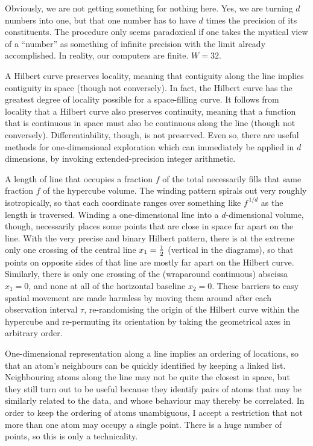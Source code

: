 Obviously, we are not getting something for nothing here.
Yes, we are turning $d$ numbers into one, but that one number has to have $d$ times the precision of its constituents.
The procedure only seems paradoxical if one takes the mystical view of a ``number'' as something of infinite precision with the limit already accomplished.
In reality, our computers are finite.  $W=32$.

A Hilbert curve preserves locality, meaning that contiguity along the line implies contiguity in space (though not conversely).  
In fact, the Hilbert curve has the greatest degree of locality possible for a space-filling curve.
It follows from locality that a Hilbert curve also preserves continuity, 
meaning that a function that is continuous in space must also be continuous along the line (though not conversely).
Differentiability, though, is not preserved.
Even so, there are useful methods for one-dimensional exploration which can immediately be applied in $d$ dimensions,
by invoking extended-precision integer arithmetic.

A length of line that occupies a fraction $f$ of the total necessarily fills that same fraction $f$ of the hypercube volume.
The winding pattern spirals out very roughly isotropically, so that each coordinate ranges over something like $f^{\,1/d}$ as the length is traversed.
Winding a one-dimensional line into a $d$-dimensional volume, though, necessarily places some points that are close in space far apart on the line.
With the very precise and binary Hilbert pattern, there is at the extreme only one crossing of the central line $x_1 = {1\over2}$ (vertical in the diagrams), 
so that points on opposite sides of that line are mostly far apart on the Hilbert curve.
Similarly, there is only one crossing of the (wraparound continuous) abscissa $x_1 = 0$, and none at all of the horizontal baseline $x_2 = 0$.
These barriers to easy spatial movement are made harmless by moving them around after each observation interval $\tau$, 
re-randomising the origin of the Hilbert curve within the hypercube and re-permuting its orientation by taking the geometrical axes in arbitrary order.

One-dimensional representation along a line implies an ordering of locations, so that an atom's neighbours can be quickly identified by keeping a linked list.
Neighbouring atoms along the line may not be quite the closest in space, 
but they still turn out to be useful because they identify pairs of atoms that may be similarly related to the data, 
and whose behaviour may thereby be correlated.
In order to keep the ordering of atoms unambiguous, I accept a restriction that not more than one atom may occupy a single point.
There is a huge number of points, so this is only a technicality.

